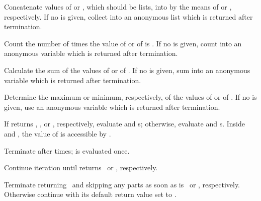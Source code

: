 \begin{LIST}{1cm}
\begin{LIST}{.5cm}
    {
    Concatenate values of  or , which should be
    lists, into  by the means of  or ,
    respectively.  If no  is given, collect into an
    anonymous list which is returned after termination. 
    }

    {
    Count the number of times the value of  or of  is \T.
    If no  is given, count into an anonymous variable
    which is returned after termination.
    }

    {
    Calculate the sum of the values of  or of .
    If no  is given, sum into an anonymous variable
    which is returned after termination.
    }

    {
    Determine the maximum or minimum, respectively, of the values of
     or of . 
    If no  is given, use an anonymous variable
    which is returned after termination.
    }

    {
    If  returns \T, \T, or \NIL, respectively, evaluate
     and s; otherwise, evaluate 
    and s. Inside  and , the value
    of  is accessible by . 
    }

    {
    Terminate  after  times;  is evaluated once.
    }

    {
    Continue iteration until  returns \NIL\ or \T, respectively.
    }

    {
    Terminate  returning \NIL\ and skipping any
     parts as soon as  is \NIL\ or \T,
    respectively. Otherwise continue  with its default return
    value set to \T. 
    }


\end{LIST}
\end{LIST}

